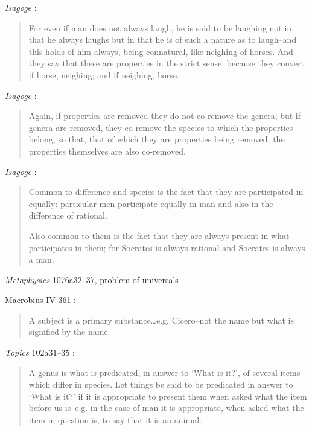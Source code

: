 \documentclass{article}
\begin{document}
{\em Isagoge} \cite[p.~12, \S 4]{isagoge}:

\begin{quote}
For even if man does not always laugh, he is said to be laughing not in that he always laughs but in that he is of such a nature as to laugh--and this holds of him always, being connatural, like neighing of horses. And they say that these are properties in the strict sense, because they convert: if horse, neighing; and if neighing, horse.
\end{quote}

{\em Isagoge} \cite[p.~15, \S 9]{isagoge}:

\begin{quote}
Again, if properties are removed they do not co-remove the genera; but if genera are removed, they co-remove the species to which the properties belong, so that, that of which they are properties being removed, the properties themselves are also co-removed.
\end{quote}

{\em Isagoge} \cite[p.~16, \S 11]{isagoge}:

\begin{quote}
Common to difference and species is the fact that they are participated in equally: particular men participate equally in man and also in the difference of rational.

Also common to them is the fact that they are always present in what participates in them; for Socrates is always rational and Socrates is always a man.
\end{quote}


{\em Metaphysics} 1076a32--37, problem of universals


Macrobius IV 361 \cite[p.~68]{isagoge}:

\begin{quote}
A subject is a primary substance\dots e.g. Cicero--not the name but what is signified by the name.
\end{quote}

{\em Topics} 102a31--35 \cite[p.~65]{isagoge}:

\begin{quote}
A genus is what is predicated, in answer to `What is it?', of several items which differ in species. Let things be said to be predicated in answer to `What is it?' if it is appropriate to present them when asked what the item before us is--e.g. in the case of man it is appropriate, when asked what the item in question is, to say that it is an animal.
\end{quote}
\end{document}
